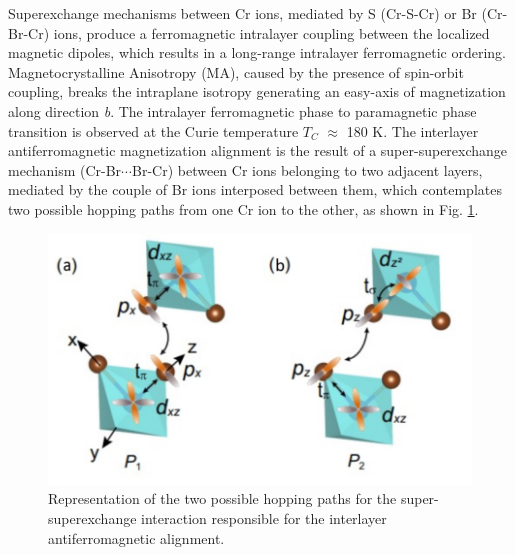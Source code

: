 \documentclass[journal]{IEEEtran}
\begin{document}
Superexchange mechanisms between Cr ions, mediated by S (Cr-S-Cr) or Br (Cr-Br-Cr) ions, produce a ferromagnetic intralayer coupling between the localized magnetic dipoles, which results in a long-range intralayer ferromagnetic ordering. Magnetocrystalline Anisotropy (MA), caused by the presence of spin-orbit coupling, breaks the intraplane isotropy generating an easy-axis of magnetization along direction \textit{b}. The intralayer ferromagnetic phase to paramagnetic phase transition is observed at the Curie temperature $T_C$ $\approx$ 180 K. The interlayer antiferromagnetic magnetization alignment is the result of a super-superexchange mechanism (Cr-Br$\cdots$Br-Cr) between Cr ions belonging to two adjacent layers, mediated by the couple of Br ions interposed between them, which contemplates two possible hopping paths from one Cr ion to the other, as shown in Fig. \ref{fig:supersuperexchange}.

\begin{figure}[h!]
    \centering
    \includegraphics[width=\linewidth]{lab2-supersuperexchange.png}
    \caption{Representation of the two possible hopping paths for the super-superexchange interaction responsible for the interlayer antiferromagnetic alignment.}
    \label{fig:supersuperexchange}
\end{figure}
\end{document}
